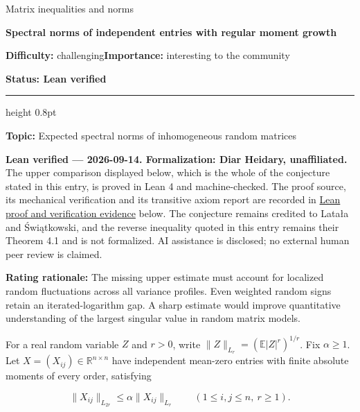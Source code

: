 \documentclass[11pt,a4paper]{article}
\makeatletter
\renewcommand{\subsection}{\Needspace{4\baselineskip}\@startsection{subsection}{2}{0pt}{9pt plus 1pt minus 1pt}{3pt}{\sffamily\bfseries\normalsize\color{ink}}}
\makeatother
\begin{document}
{\sffamily\small\color{muted}Matrix inequalities and norms\par}
\vspace{3pt}
{\raggedright{}\sffamily\bfseries\fontsize{21}{24}\selectfont\color{ink}Spectral
norms of independent entries with regular moment growth\par}
\vspace{7pt}
{\sffamily\small\textbf{Difficulty:} challenging\quad\textbf{Importance:} interesting
to the community\par}
{\sffamily\small\bfseries\color{accent}Status: Lean verified\par}
\vspace{4pt}
{\color{accent}\hrule height 0.8pt}
\vspace{6pt}
\textbf{Topic:} Expected spectral norms of inhomogeneous random matrices

\textbf{Lean verified --- 2026-09-14. Formalization: Diar Heidary,
unaffiliated.} The upper comparison displayed below, which is the whole
of the conjecture stated in this entry, is proved in Lean 4 and
machine-checked. The proof source, its mechanical verification and its
transitive axiom report are recorded in
\href{https://github.com/ajt60gaibb/OpenProblemsInNLA/blob/main/matrix-inequalities-and-norms/MI-32\#lean-proof-and-verification-evidence--2026-09-14}{Lean
proof and verification evidence} below. The conjecture remains credited
to Latała and Świątkowski, and the reverse inequality quoted in this
entry remains their Theorem 4.1 and is not formalized. AI assistance is
disclosed; no external human peer review is claimed.

\textbf{Rating rationale:} The missing upper estimate must account for
localized random fluctuations across all variance profiles. Even
weighted random signs retain an iterated-logarithm gap. A sharp estimate
would improve quantitative understanding of the largest singular value
in random matrix models.

\subsection{Statement}\label{statement}

For a real random variable \(Z\) and \(r>0\), write
\(\|Z\|_{L_r}=(\mathbb E|Z|^r)^{1/r}\). Fix \(\alpha\ge1\). Let
\(X=(X_{ij})\in\mathbb R^{n\times n}\) have independent mean-zero
entries with finite absolute moments of every order, satisfying

\[\|X_{ij}\|_{L_{2r}}\le\alpha\|X_{ij}\|_{L_r}
\qquad(1\le i,j\le n,\ r\ge1).\]
\end{document}
